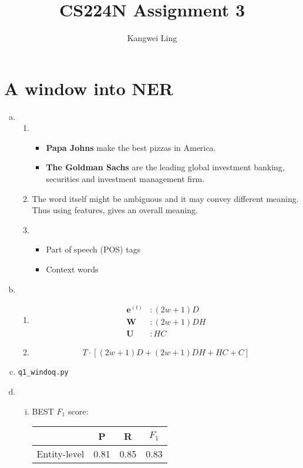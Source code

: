 \documentclass{article}[11pt]
\title{CS224N Assignment 3}
\author{Kangwei Ling}
\newcommand{\bW} { \bm{W} }
\newcommand{\bU} { \bm{U} }
\newcommand{\be} { \bm{e}}
\newcommand{\bet}[1][t]{ \be^{(#1)}}
\begin{document}
\maketitle

\section{A window into NER}

\begin{enumerate}[(a)]
\item 
	\begin{enumerate}[(i.)]
	\item 
		\begin{itemize}
		\item \textbf{Papa Johns} make the best pizzas in America.
		\item \textbf{The Goldman Sachs} are the leading global investment banking, securities and investment management firm.
		\end{itemize}
	\item 
		The word itself might be ambiguous and it may convey different meaning.
		Thus using features, gives an overall meaning.
		
	\item
		\begin{itemize}
		\item Part of speech (POS) tags
		\item Context words  
		\end{itemize}
		\end{enumerate}
\item
	\begin{enumerate}[(i.)]
	\item 
		\begin{align*}
		\bet &: (2w+1)D \\
		\bW  &: (2w+1)DH \\
		\bU  &: HC
		\end{align*}
		\item \[T \cdot [(2w+1)D +  (2w+1)DH + HC + C]\]
	\end{enumerate}

\item \verb|q1_windoq.py|
\item
	\begin{enumerate}[i.]
	\item BEST $F_1$ score:
	\begin{table}[H]
		\centering
		\begin{tabular}{c|c|c|c}
		&P&R&$F_1$ \\ \hline \hline
		Entity-level & 0.81 & 0.85 & 0.83 \\ \hline
	\end{tabular}
	\end{table}


\end{enumerate}
\end{enumerate}
\end{document}
